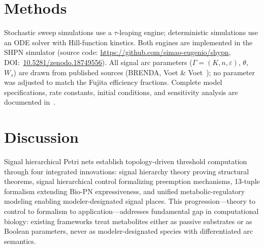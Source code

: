 \documentclass[10pt,letterpaper]{article}
\begin{document}
\section{Methods}
\label{sec:methods}

Stochastic sweep simulations use a $\tau$-leaping engine; deterministic simulations use an ODE solver with Hill-function kinetics. Both engines are implemented in the SHPN simulator (source code: \url{https://github.com/simao-eugenio/shypn}, DOI:~\href{https://doi.org/10.5281/zenodo.18749556}{10.5281/zenodo.18749556}). All signal arc parameters ($\Gamma = (K, n, \varepsilon)$, $\theta$, $W_s$) are drawn from published sources (BRENDA, Voet \& Voet~\cite{voet2016}); no parameter was adjusted to match the Fujita efficiency fractions. Complete model specifications, rate constants, initial conditions, and sensitivity analysis are documented in~\cite{subtilis2026}.

\section{Discussion}
\label{sec:discussion}

Signal hierarchical Petri nets establish topology-driven threshold computation
through four integrated innovations: signal hierarchy theory proving structural
theorems, signal hierarchical control formalizing preemption mechanisms,
13-tuple formalism extending Bio-PN expressiveness, and unified
metabolic-regulatory modeling enabling modeler-designated signal places.
This progression---theory to control to formalism to application---addresses
fundamental gap in computational biology: existing frameworks treat metabolites
either as passive substrates or as Boolean parameters, never as
modeler-designated species with differentiated arc semantics.
\end{document}
